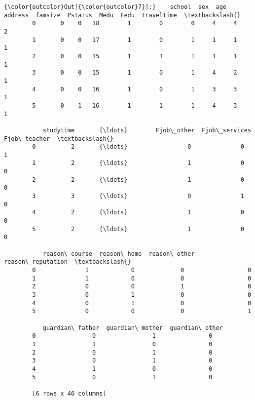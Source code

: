 \documentclass[11pt]{article}
\begin{document}
\begin{Verbatim}[commandchars=\\\{\}]
{\color{outcolor}Out[{\color{outcolor}7}]:}    school  sex  age  address  famsize  Pstatus  Medu  Fedu  traveltime  \textbackslash{}
        0       0    0   18        1        0        0     4     4           2   
        1       0    0   17        1        0        1     1     1           1   
        2       0    0   15        1        1        1     1     1           1   
        3       0    0   15        1        0        1     4     2           1   
        4       0    0   16        1        0        1     3     3           1   
        5       0    1   16        1        1        1     4     3           1   
        
           studytime       {\ldots}        Fjob\_other  Fjob\_services  Fjob\_teacher  \textbackslash{}
        0          2       {\ldots}                 0              0             1   
        1          2       {\ldots}                 1              0             0   
        2          2       {\ldots}                 1              0             0   
        3          3       {\ldots}                 0              1             0   
        4          2       {\ldots}                 1              0             0   
        5          2       {\ldots}                 1              0             0   
        
           reason\_course  reason\_home  reason\_other  reason\_reputation  \textbackslash{}
        0              1            0             0                  0   
        1              1            0             0                  0   
        2              0            0             1                  0   
        3              0            1             0                  0   
        4              0            1             0                  0   
        5              0            0             0                  1   
        
           guardian\_father  guardian\_mother  guardian\_other  
        0                0                1               0  
        1                1                0               0  
        2                0                1               0  
        3                0                1               0  
        4                1                0               0  
        5                0                1               0  
        
        [6 rows x 46 columns]
\end{Verbatim}
            
\end{document}
